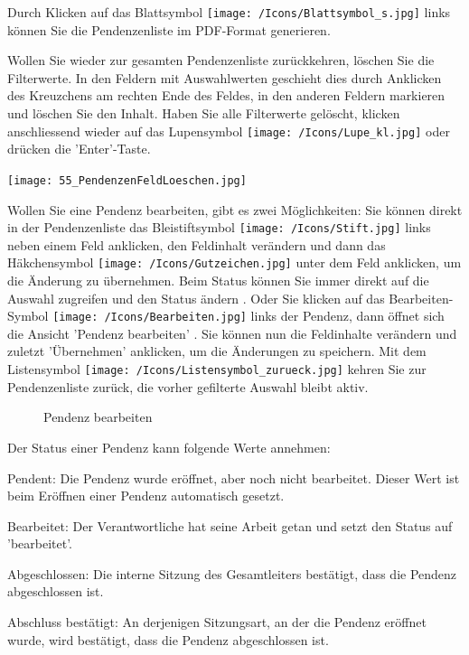 Durch Klicken auf das Blattsymbol \texttt{[image: /Icons/Blattsymbol\_s.jpg]}  links können Sie die Pendenzenliste im PDF-Format generieren.

\vspace{\baselineskip}

Wollen Sie wieder zur gesamten Pendenzenliste zurückkehren, löschen Sie die Filterwerte. In den Feldern mit Auswahlwerten geschieht dies durch Anklicken des Kreuzchens  am rechten Ende des Feldes, in den anderen Feldern markieren und löschen Sie den Inhalt. Haben Sie alle Filterwerte gelöscht, klicken anschliessend wieder auf das Lupensymbol \texttt{[image: /Icons/Lupe\_kl.jpg]}  oder drücken die 'Enter'-Taste.

\begin{center}
\texttt{[image: 55\_PendenzenFeldLoeschen.jpg]}
\end{center}

Wollen Sie eine Pendenz bearbeiten, gibt es zwei Möglichkeiten: Sie können direkt in der Pendenzenliste das Bleistiftsymbol \texttt{[image: /Icons/Stift.jpg]}  links neben einem Feld anklicken, den Feldinhalt verändern und dann das Häkchensymbol \texttt{[image: /Icons/Gutzeichen.jpg]}  unter dem Feld anklicken, um die Änderung zu übernehmen. Beim Status können Sie immer direkt auf die Auswahl zugreifen und den Status ändern . Oder Sie klicken auf das Bearbeiten-Symbol \texttt{[image: /Icons/Bearbeiten.jpg]}  links der Pendenz, dann öffnet sich die Ansicht 'Pendenz bearbeiten' . Sie können nun die Feldinhalte verändern und zuletzt 'Übernehmen' anklicken, um die Änderungen zu speichern. Mit dem Listensymbol \texttt{[image: /Icons/Listensymbol\_zurueck.jpg]}  kehren Sie zur Pendenzenliste zurück, die vorher gefilterte Auswahl bleibt aktiv.


\begin{figure}[H]
\caption{Pendenz bearbeiten}
\end{figure}

Der Status einer Pendenz kann folgende Werte annehmen:

\begin{compactitem}
\item
Pendent: Die Pendenz wurde eröffnet, aber noch nicht bearbeitet. Dieser Wert ist beim Eröffnen einer Pendenz automatisch gesetzt.
\item
Bearbeitet: Der Verantwortliche hat seine Arbeit getan und setzt den Status auf 'bearbeitet'.
\item
Abgeschlossen: Die interne Sitzung des Gesamtleiters bestätigt, dass die Pendenz abgeschlossen ist.
\item
Abschluss bestätigt: An derjenigen Sitzungsart, an der die Pendenz eröffnet wurde, wird bestätigt, dass die Pendenz
abgeschlossen ist.
\end{compactitem}

